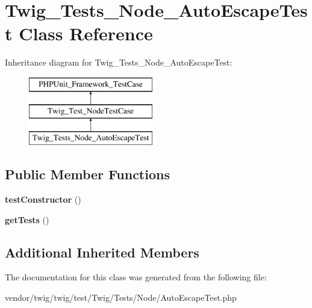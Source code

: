 \hypertarget{classTwig__Tests__Node__AutoEscapeTest}{}\section{Twig\+\_\+\+Tests\+\_\+\+Node\+\_\+\+Auto\+Escape\+Test Class Reference}
\label{classTwig__Tests__Node__AutoEscapeTest}
Inheritance diagram for Twig\+\_\+\+Tests\+\_\+\+Node\+\_\+\+Auto\+Escape\+Test\+:\begin{figure}[H]
\begin{center}
\leavevmode
\includegraphics[height=3.000000cm]{classTwig__Tests__Node__AutoEscapeTest}
\end{center}
\end{figure}
\subsection*{Public Member Functions}
\begin{DoxyCompactItemize}
\item 
{\bfseries test\+Constructor} ()\hypertarget{classTwig__Tests__Node__AutoEscapeTest_a53b1198333a7eb7d98ab7caaa05c7dcf}{}\label{classTwig__Tests__Node__AutoEscapeTest_a53b1198333a7eb7d98ab7caaa05c7dcf}

\item 
{\bfseries get\+Tests} ()\hypertarget{classTwig__Tests__Node__AutoEscapeTest_ac40c8f1c66fcb1f29c5b8127bec34114}{}\label{classTwig__Tests__Node__AutoEscapeTest_ac40c8f1c66fcb1f29c5b8127bec34114}

\end{DoxyCompactItemize}
\subsection*{Additional Inherited Members}


The documentation for this class was generated from the following file\+:\begin{DoxyCompactItemize}
\item 
vendor/twig/twig/test/\+Twig/\+Tests/\+Node/Auto\+Escape\+Test.\+php\end{DoxyCompactItemize}
